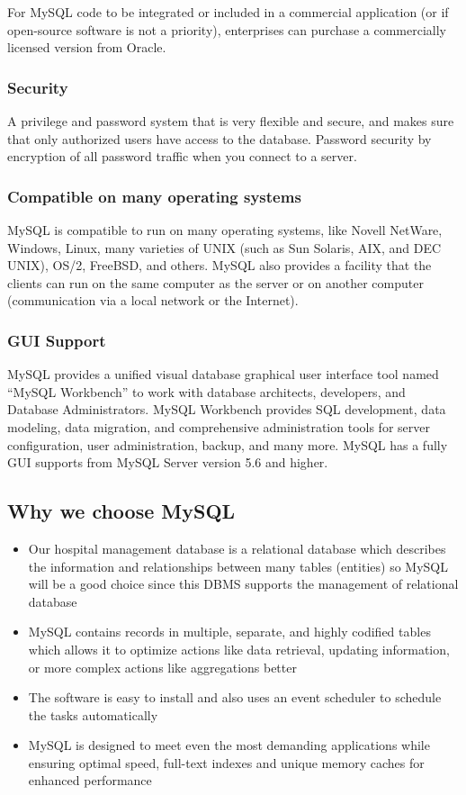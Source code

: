 \documentclass[a4paper]{article}
\numberwithin{equation}{section}
\begin{document}
For MySQL code to be integrated or included in a commercial application (or if open-source software is not a priority), enterprises can purchase a commercially licensed version from Oracle.

\subsubsection{Security}
A privilege and password system that is very flexible and secure, and makes sure that only authorized users have access to the database.
Password security by encryption of all password traffic when you connect to a server.

\subsubsection{Compatible on many operating systems}

MySQL is compatible to run on many operating systems, like Novell NetWare, Windows, Linux, many varieties of UNIX (such as Sun Solaris, AIX, and DEC UNIX), OS/2, FreeBSD, and others. MySQL also provides a facility that the clients can run on the same computer as the server or on another computer (communication via a local network or the Internet).

\subsubsection{GUI Support}

MySQL provides a unified visual database graphical user interface tool named  ``MySQL Workbench'' to work with database architects, developers, and Database Administrators.
MySQL Workbench provides SQL development, data modeling, data migration, and comprehensive administration tools for server configuration, user administration, backup, and many more.
MySQL has a fully GUI supports from MySQL Server version 5.6 and higher.


\subsection{Why we choose MySQL}
\begin{itemize}
  \item Our hospital management database is a relational database which describes the information and relationships between many tables (entities) so MySQL will be a good choice since this DBMS supports the management of relational database
  \item MySQL contains records in multiple, separate, and highly codified tables which allows it to optimize actions like data retrieval, updating information, or more complex actions like aggregations better
  \item The software is easy to install and also uses an event scheduler to schedule the tasks automatically
  \item MySQL is designed to meet even the most demanding applications while ensuring optimal speed, full-text indexes and unique memory caches for enhanced performance
\end{itemize}
\end{document}

